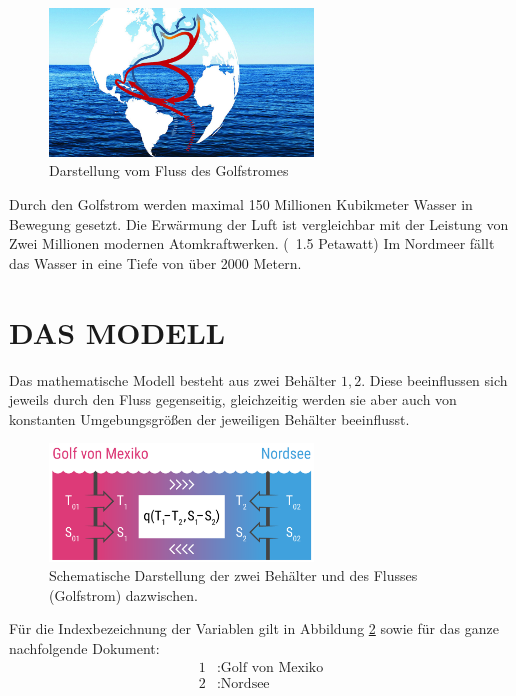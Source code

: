 \documentclass[a4paper,twoside]{article}
\begin{document}
	\begin{figure}[!h]
  		\centering
 		\includegraphics[width=7cm]{../Diagramme/Golfstrom.jpg}
  		\caption{Darstellung vom Fluss des Golfstromes}
  		\label{fig:modell}
	\end{figure}

Durch den Golfstrom werden maximal 150 Millionen Kubikmeter Wasser in Bewegung gesetzt. 
Die Erwärmung der Luft ist vergleichbar mit der Leistung von Zwei Millionen modernen Atomkraftwerken. (~1.5 Petawatt)
Im Nordmeer fällt das Wasser in eine Tiefe von über 2000 Metern.
 
	

	
	\section{\uppercase{Das Modell}}\label{sec:Modell}
	
	
	\noindent Das mathematische Modell besteht aus zwei Behälter \(1,2\). Diese beeinflussen sich jeweils durch den Fluss gegenseitig, gleichzeitig werden sie aber auch von konstanten Umgebungsgrößen der jeweiligen Behälter beeinflusst.
	
	\begin{figure}[!h]
  		\centering
 		\includegraphics[width=7cm]{../Diagramme/skizze_modell.png}
  		\caption{Schematische Darstellung der zwei Behälter und des Flusses (Golfstrom) dazwischen.}
  		\label{fig:modell}
	\end{figure}
	
	Für die Indexbezeichnung der Variablen gilt in Abbildung \ref{fig:modell} sowie für das ganze nachfolgende Dokument:
	\begin{align*}
		1 &: \textrm{Golf von Mexiko} \\
		2 &: \textrm{Nordsee}
	\end{align*}
\end{document}
